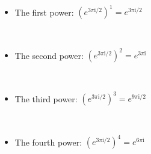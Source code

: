 \documentclass[11pt]{article}
\providecommand{\tightlist}{%
      \setlength{\itemsep}{0pt}\setlength{\parskip}{0pt}}
\begin{document}
    \begin{center}
    \end{center}
    { \hspace*{\fill} \\}
    
    \begin{itemize}
\tightlist
\item
  The first power:
  \((e^{3\pi\mathrm{i}/{2}})^1 = e^{3\pi\mathrm{i}/{2}}\)
\end{itemize}

    \begin{center}
    \end{center}
    { \hspace*{\fill} \\}
    
    \begin{itemize}
\tightlist
\item
  The second power: \((e^{3\pi\mathrm{i}/{2}})^2 = e^{3\pi\mathrm{i}}\)
\end{itemize}

    \begin{center}
    \end{center}
    { \hspace*{\fill} \\}
    
    \begin{itemize}
\tightlist
\item
  The third power: \((e^{3\pi\mathrm{i}/{2}})^3 = e^{9\pi\mathrm{i}/2}\)
\end{itemize}

    \begin{center}
    \end{center}
    { \hspace*{\fill} \\}
    
    \begin{itemize}
\tightlist
\item
  The fourth power: \((e^{3\pi\mathrm{i}/{2}})^4 = e^{6\pi\mathrm{i}}\)
\end{itemize}

    \begin{center}
    \end{center}
    { \hspace*{\fill} \\}
    
\end{document}
